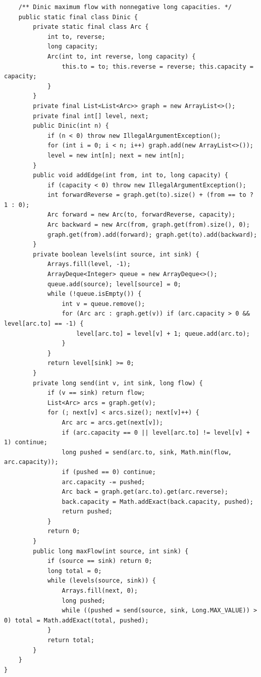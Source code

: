 \documentclass[10pt,letterpaper]{article}
\begin{document}
\begin{lstlisting}
    /** Dinic maximum flow with nonnegative long capacities. */
    public static final class Dinic {
        private static final class Arc {
            int to, reverse;
            long capacity;
            Arc(int to, int reverse, long capacity) {
                this.to = to; this.reverse = reverse; this.capacity = capacity;
            }
        }
        private final List<List<Arc>> graph = new ArrayList<>();
        private final int[] level, next;
        public Dinic(int n) {
            if (n < 0) throw new IllegalArgumentException();
            for (int i = 0; i < n; i++) graph.add(new ArrayList<>());
            level = new int[n]; next = new int[n];
        }
        public void addEdge(int from, int to, long capacity) {
            if (capacity < 0) throw new IllegalArgumentException();
            int forwardReverse = graph.get(to).size() + (from == to ? 1 : 0);
            Arc forward = new Arc(to, forwardReverse, capacity);
            Arc backward = new Arc(from, graph.get(from).size(), 0);
            graph.get(from).add(forward); graph.get(to).add(backward);
        }
        private boolean levels(int source, int sink) {
            Arrays.fill(level, -1);
            ArrayDeque<Integer> queue = new ArrayDeque<>();
            queue.add(source); level[source] = 0;
            while (!queue.isEmpty()) {
                int v = queue.remove();
                for (Arc arc : graph.get(v)) if (arc.capacity > 0 && level[arc.to] == -1) {
                    level[arc.to] = level[v] + 1; queue.add(arc.to);
                }
            }
            return level[sink] >= 0;
        }
        private long send(int v, int sink, long flow) {
            if (v == sink) return flow;
            List<Arc> arcs = graph.get(v);
            for (; next[v] < arcs.size(); next[v]++) {
                Arc arc = arcs.get(next[v]);
                if (arc.capacity == 0 || level[arc.to] != level[v] + 1) continue;
                long pushed = send(arc.to, sink, Math.min(flow, arc.capacity));
                if (pushed == 0) continue;
                arc.capacity -= pushed;
                Arc back = graph.get(arc.to).get(arc.reverse);
                back.capacity = Math.addExact(back.capacity, pushed);
                return pushed;
            }
            return 0;
        }
        public long maxFlow(int source, int sink) {
            if (source == sink) return 0;
            long total = 0;
            while (levels(source, sink)) {
                Arrays.fill(next, 0);
                long pushed;
                while ((pushed = send(source, sink, Long.MAX_VALUE)) > 0) total = Math.addExact(total, pushed);
            }
            return total;
        }
    }
}
\end{lstlisting}
\end{document}
